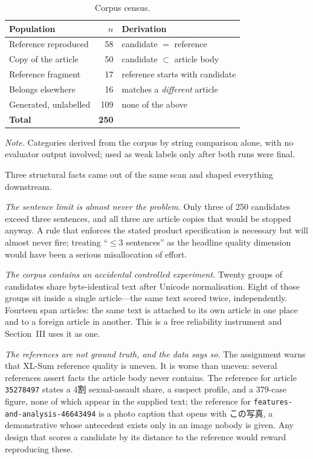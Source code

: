 \documentclass[conference]{IEEEtran}
\newcommand{\tabnote}[1]{%
  \par\vspace{2.5pt}%
  \noindent\parbox{\columnwidth}{\raggedright\scriptsize #1\par}}
\begin{document}
\begin{table}[t]
\caption{Corpus census.}
\label{tab:census}
\centering\footnotesize
\begin{tabularx}{\columnwidth}{@{}p{27mm}rY@{}}
\toprule
\textbf{Population} & \textbf{$n$} & \textbf{Derivation} \\
\midrule
Reference reproduced   & 58  & candidate $=$ reference \\
Copy of the article    & 50  & candidate $\subset$ article body \\
Reference fragment     & 17  & reference starts with candidate \\
Belongs elsewhere      & 16  & matches a \emph{different} article \\
Generated, unlabelled  & 109 & none of the above \\
\midrule
\textbf{Total}         & \textbf{250} & \\
\bottomrule
\end{tabularx}
\tabnote{\textit{Note.} Categories derived from the corpus by string
comparison alone, with no evaluator output involved; used as weak labels
only after both runs were final.}
\end{table}

Three structural facts came out of the same scan and shaped everything
downstream.

\emph{The sentence limit is almost never the problem.} Only three of 250
candidates exceed three sentences, and all three are article copies that
would be stopped anyway. A rule that enforces the stated product
specification is necessary but will almost never fire; treating
``$\leq 3$ sentences'' as the headline quality dimension would have been
a serious misallocation of effort.

\emph{The corpus contains an accidental controlled experiment.} Twenty
groups of candidates share byte-identical text after Unicode
normalisation. Eight of those groups sit inside a single article---the
same text scored twice, independently. Fourteen span articles: the same
text is attached to its own article in one place and to a foreign
article in another. This is a free reliability instrument and Section~III
uses it as one.

\emph{The references are not ground truth, and the data says so.} The
assignment warns that XL-Sum reference quality is uneven. It is worse
than uneven: several references assert facts the article body never
contains. The reference for article \texttt{35278497} states a 4割
sexual-assault share, a suspect profile, and a 379-case figure, none of
which appear in the supplied text; the reference for
\texttt{features-and-analysis-46643494} is a photo caption that opens
with \mbox{この写真}, a demonstrative whose antecedent exists only in an image
nobody is given. Any design that scores a candidate by its distance to
the reference would reward reproducing these.
\end{document}
